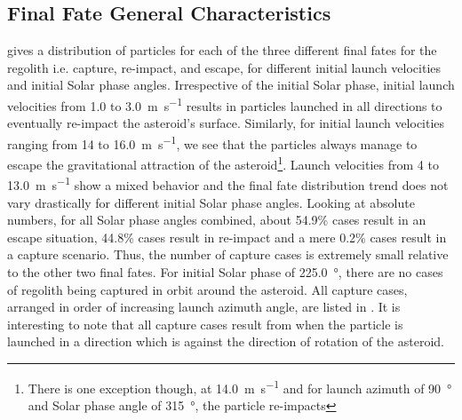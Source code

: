 \subsection{Final Fate General Characteristics}
\label{subsec:final_fate_charac_general}
 gives a distribution of particles for each of the three different final fates for the regolith i.e. capture, re-impact, and escape, for different initial launch velocities and initial Solar phase angles. Irrespective of the initial Solar phase, initial launch velocities from 1.0 to \SI{3.0}{\metre\per\second} results in particles launched in all directions to eventually re-impact the asteroid's surface. Similarly, for initial launch velocities ranging from 14 to \SI{16.0}{\metre\per\second}, we see that the particles always manage to escape the gravitational attraction of the asteroid\footnote{There is one exception though, at \SI{14.0}{\metre\per\second} and for launch azimuth of \SI{90}{\degree} and Solar phase angle of \SI{315}{\degree}, the particle re-impacts}. Launch velocities from 4 to \SI{13.0}{\metre\per\second} show a mixed behavior and the final fate distribution trend does not vary drastically for different initial Solar phase angles. Looking at absolute numbers, for all Solar phase angles combined, about 54.9\% cases result in an escape situation, 44.8\% cases result in re-impact and a mere 0.2\% cases result in a capture scenario. Thus, the number of capture cases is extremely small relative to the other two final fates.
%
\newline\newline
%
For initial Solar phase of \SI{225.0}{\degree}, there are no cases of regolith being captured in orbit around the asteroid. All capture cases, arranged in order of increasing launch azimuth angle, are listed in . It is interesting to note that all capture cases result from when the particle is launched in a direction which is against the direction of rotation of the asteroid.
